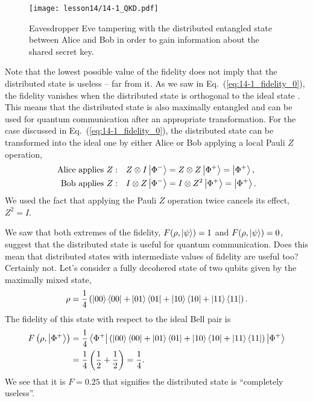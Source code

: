 \begin{figure}[t]
    \centering
    \texttt{[image: lesson14/14-1\_QKD.pdf]}
    \caption[Eavesdropper Eve]{Eavesdropper Eve tampering with the distributed entangled state between Alice and Bob in order to gain information about the shared secret key.}
    \label{fig:14-1_QKD}
\end{figure}

Note that the lowest possible value of the fidelity does not imply that the distributed state is useless -- far from it.
As we saw in Eq.~(\ref{eq:14-1_fidelity_0}), the fidelity vanishes when the distributed state is orthogonal to the ideal state \ket{\Phi^+}.
This means that the distributed state is also maximally entangled and can be used for quantum communication after an appropriate transformation.
For the case discussed in Eq.~(\ref{eq:14-1_fidelity_0}), the distributed state can be transformed into the ideal one by either Alice or Bob applying a local Pauli $Z$ operation,
\begin{align}
    \text{Alice applies } Z: \quad & Z \otimes I \left| \Phi^- \right\rangle = Z \otimes Z \left| \Phi^+ \right\rangle = \left| \Phi^+ \right\rangle, \\
    \text{Bob applies } Z: \quad & I \otimes Z \left| \Phi^- \right\rangle = I \otimes Z^2 \left| \Phi^+ \right\rangle = \left| \Phi^+ \right\rangle.
\end{align}
We used the fact that applying the Pauli $Z$ operation twice cancels its effect, $Z^2 = I$.

We saw that both extremes of the fidelity, $F(\rho,\left| \psi \right\rangle) = 1$ and $F(\rho,\left| \psi \right\rangle) = 0$, suggest that the distributed state is useful for quantum communication.
Does this mean that distributed states with intermediate values of fidelity are useful too?
Certainly not.
Let's consider a fully decohered state of two qubits given by the maximally mixed state,
\begin{equation}
    \rho = \frac{1}{4} \left( \left| 00 \right\rangle\left\langle 00 \right| + \left| 01 \right\rangle\left\langle 01 \right| + \left| 10 \right\rangle\left\langle 10 \right| + \left| 11 \right\rangle\left\langle 11 \right| \right).
\end{equation}
The fidelity of this state with respect to the ideal Bell pair \ket{\Phi^+} is
\begin{align}
    F \left( \rho, \left| \Phi^+ \right\rangle \right) & = \frac{1}{4} \left\langle \Phi^+ \right| \left( \left| 00 \right\rangle\left\langle 00 \right| + \left| 01 \right\rangle\left\langle 01 \right| + \left| 10 \right\rangle\left\langle 10 \right| + \left| 11 \right\rangle\left\langle 11 \right| \right) \left| \Phi^+ \right\rangle \nonumber\\
    & = \frac{1}{4} \left( \frac{1}{2} + \frac{1}{2} \right) = \frac{1}{4}.
\end{align}
We see that it is $F=0.25$ that signifies the distributed state is ``completely useless''.

